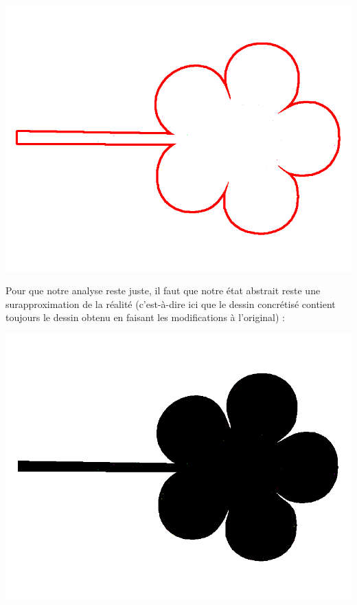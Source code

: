 \documentclass[french]{article}
\begin{document}
  \begin{center}
    \includegraphics[scale=0.19]{./pictures/flower5.png}
  \end{center}
  
  Pour que notre analyse reste juste, il faut que notre état abstrait reste une surapproximation de la réalité (c'est-à-dire ici que le dessin concrétisé contient toujours le dessin obtenu en faisant les modifications à l'original) :

  \begin{center}
    \includegraphics[scale=0.19]{./pictures/flower6.png}
  \end{center}
  
\end{document}
